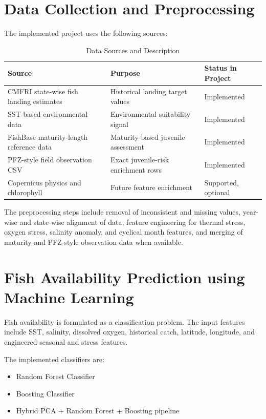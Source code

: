 \documentclass[12pt,a4paper]{report}
\begin{document}
\section{Data Collection and Preprocessing}
The implemented project uses the following sources:
\begin{table}[H]
\centering
\caption{Data Sources and Description}
\begin{tabular}{p{} p{} p{}}
\toprule
\textbf{Source} & \textbf{Purpose} & \textbf{Status in Project} \\
\midrule
CMFRI state-wise fish landing estimates & Historical landing target values & Implemented \\
SST-based environmental data & Environmental suitability signal & Implemented \\
FishBase maturity-length reference data & Maturity-based juvenile assessment & Implemented \\
PFZ-style field observation CSV & Exact juvenile-risk enrichment rows & Implemented \\
Copernicus physics and chlorophyll & Future feature enrichment & Supported, optional \\
\bottomrule
\end{tabular}
\end{table}

The preprocessing steps include removal of inconsistent and missing values, year-wise and state-wise alignment of data, feature engineering for thermal stress, oxygen stress, salinity anomaly, and cyclical month features, and merging of maturity and PFZ-style observation data when available.

\section{Fish Availability Prediction using Machine Learning}
Fish availability is formulated as a classification problem. The input features include SST, salinity, dissolved oxygen, historical catch, latitude, longitude, and engineered seasonal and stress features.

The implemented classifiers are:
\begin{itemize}[leftmargin=1.5cm]
    \item Random Forest Classifier
    \item Boosting Classifier
    \item Hybrid PCA + Random Forest + Boosting pipeline
\end{itemize}
\end{document}
